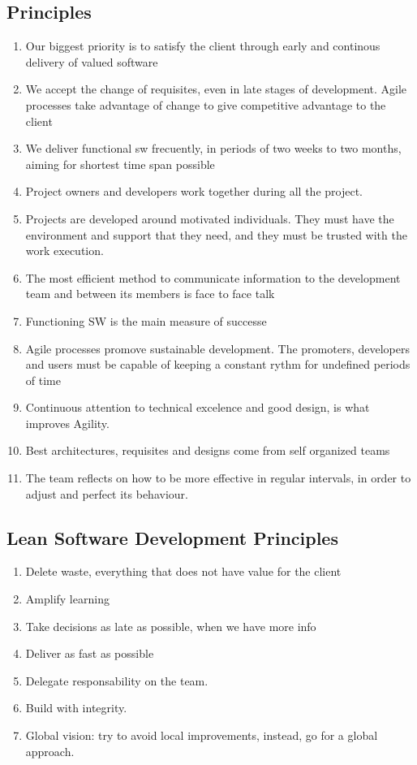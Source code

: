 \documentclass[a4paper,12pt]{article}
\begin{document}
\subsection{Principles}
\begin{enumerate}
\item Our biggest priority is to satisfy the client through early and continous delivery of valued software
\item We accept the change of requisites, even in late stages of development. Agile processes take advantage of change to give competitive advantage to the client
\item We deliver functional sw frecuently, in periods of two weeks to two months, aiming for shortest time span possible
\item Project owners and developers work together during all the project.
\item Projects are developed around motivated individuals. They must have the environment and support that they need, and they must be trusted with the work execution.
\item The most efficient method to communicate information to the development team and between its members is face to face talk
\item Functioning SW is the main measure of successe
\item Agile processes promove sustainable development. The promoters, developers and users must be capable of keeping a constant rythm for undefined periods of time
\item Continuous attention to technical excelence and good design, is what improves Agility.
\item Best architectures, requisites and designs come from self organized teams
\item The team reflects on how to be more effective in regular intervals, in order to adjust and perfect its behaviour.

\end{enumerate}

\subsection{Lean Software Development Principles}

\begin{enumerate}
\item Delete waste, everything that does not have value for the client
\item Amplify learning
\item Take decisions as late as possible, when we have more info
\item Deliver as fast as possible
\item Delegate responsability on the team.
\item Build with integrity.
\item Global vision: try to avoid local improvements, instead, go for a global approach.

\end{enumerate}
\end{document}
